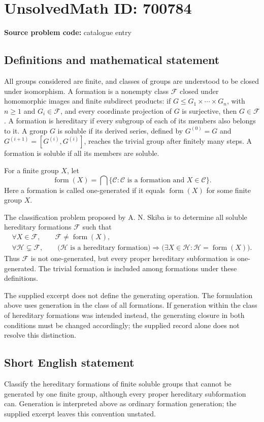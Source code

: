 \documentclass[11pt]{article}
\begin{document}
\section*{UnsolvedMath ID: 700784}
\textbf{Source problem code:} catalogue entry
\subsection{Definitions and mathematical statement}
All groups considered are finite, and classes of groups are understood to be closed under isomorphism. A formation is a nonempty class \(\mathcal F\) closed under homomorphic images and finite subdirect products: if \(G\leq G_1\times\cdots\times G_n\), with \(n\geq1\) and \(G_i\in\mathcal F\), and every coordinate projection of \(G\) is surjective, then \(G\in\mathcal F\). A formation is hereditary if every subgroup of each of its members also belongs to it. A group \(G\) is soluble if its derived series, defined by \(G^{(0)}=G\) and \(G^{(i+1)}=[G^{(i)},G^{(i)}]\), reaches the trivial group after finitely many steps. A formation is soluble if all its members are soluble.

For a finite group \(X\), let
\[
\operatorname{form}(X)=\bigcap\{\mathcal C:\mathcal C\text{ is a formation and }X\in\mathcal C\}.
\]
Here a formation is called one-generated if it equals \(\operatorname{form}(X)\) for some finite group \(X\).

The classification problem proposed by A. N. Skiba is to determine all soluble hereditary formations \(\mathcal F\) such that
\[
\begin{gathered}
\forall X\in\mathcal F,\qquad \mathcal F\ne\operatorname{form}(X),\\
\forall\mathcal H\subsetneq\mathcal F,\qquad
\bigl(\mathcal H\text{ is a hereditary formation}\bigr)
\Longrightarrow
\bigl(\exists X\in\mathcal H:\mathcal H=\operatorname{form}(X)\bigr).
\end{gathered}
\]
Thus \(\mathcal F\) is not one-generated, but every proper hereditary subformation is one-generated. The trivial formation is included among formations under these definitions.

The supplied excerpt does not define the generating operation. The formulation above uses generation in the class of all formations. If generation within the class of hereditary formations was intended instead, the generating closure in both conditions must be changed accordingly; the supplied record alone does not resolve this distinction.
\subsection{Short English statement}
Classify the hereditary formations of finite soluble groups that cannot be generated by one finite group, although every proper hereditary subformation can. Generation is interpreted above as ordinary formation generation; the supplied excerpt leaves this convention unstated.
\end{document}
